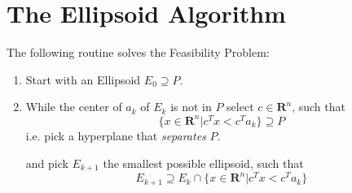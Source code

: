 \documentclass[10pt]{article}
\newcommand{\R}{\mathbf{R}}
\newcommand{\transpose}{T}
\begin{document}
\section{The Ellipsoid Algorithm}
The following routine solves the Feasibility Problem:
\begin{enumerate}
\item Start with an Ellipsoid $E_0 \supseteq P$. 
\item While the center of $a_k$ of $E_k$ is not in $P$ select $c \in \R^n$, such that
\[
\{x \in \R^n | c^\transpose x < c^\transpose a_k \} \supseteq P
\]
i.e. pick a hyperplane that \emph{separates} $P$.

and pick $E_{k+1}$ the smallest possible ellipsoid, such that
\[
E_{k+1} \supseteq E_k \cap \{x \in \R^n | c^\transpose x < c^\transpose a_k \}
\]
\end{enumerate}
\end{document}
